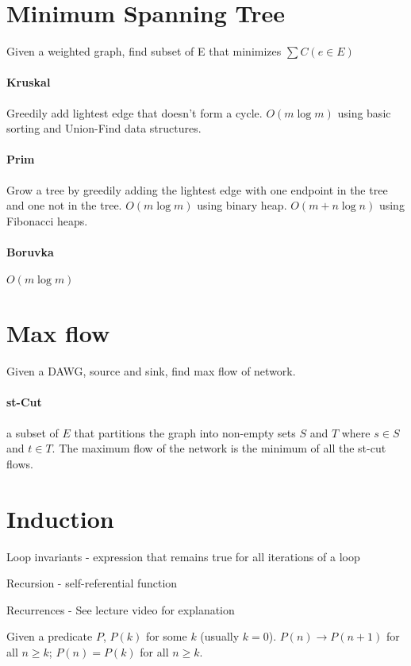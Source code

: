 \documentclass[a4paper]{article}
\newenvironment{enumerate*}%
  {\begin{enumerate}%
    \setlength{\itemsep}{0.5pt}%
    \setlength{\parsep}{0pt}%
    \setlength{\parskip}{0pt}}%
  {\end{enumerate}}
\begin{document}
\section{Minimum Spanning Tree}
Given a weighted graph, find subset of E that minimizes $\sum{C(e \in E)}$

\paragraph{Kruskal}
Greedily add lightest edge that doesn't form a cycle. $O(m \log m)$ using basic sorting and Union-Find data structures.

\paragraph{Prim}
Grow a tree by greedily adding the lightest edge with one endpoint in the tree and one not in the tree. $O(m \log m)$ using binary heap. $O(m + n\log n)$ using Fibonacci heaps.

\paragraph{Boruvka}
$O(m \log m)$

\section{Max flow}
Given a DAWG, source and sink, find max flow of network.

\paragraph{st-Cut}
a subset of $E$ that partitions the graph into non-empty sets $S$ and $T$ where $s \in S$ and $t \in T$. The maximum flow of the network is the minimum of all the st-cut flows.

\section{Induction}
\begin{enumerate*}
\item Loop invariants - expression that remains true for all iterations of a loop
\item Recursion - self-referential function
\item Recurrences - See lecture video for explanation
\end{enumerate*}

Given a predicate $P$, $P(k)$ for some $k$ (usually $k=0$). $P(n) \to P(n+1)$ for all $n \ge k$; $P(n) = P(k)$ for all $n \ge k$.
\end{document}
